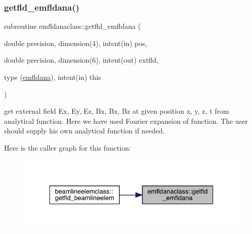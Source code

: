 \subsubsection{\texorpdfstring{getfld\_emfldana()}{getfld\_emfldana()}}
{\footnotesize\ttfamily subroutine emfldanaclass\+::getfld\+\_\+emfldana (\begin{DoxyParamCaption}\item[{double precision, dimension(4), intent(in)}]{pos,  }\item[{double precision, dimension(6), intent(out)}]{extfld,  }\item[{type (\mbox{\hyperlink{namespaceemfldanaclass_structemfldanaclass_1_1emfldana}{emfldana}}), intent(in)}]{this }\end{DoxyParamCaption})}



get external field Ex, Ey, Ez, Bx, Bx, Bz at given position x, y, z, t from analytical function. Here we have used Fourier expansion of function. The user should supply his own analytical function if needed. 

Here is the caller graph for this function\+:\nopagebreak
\begin{figure}[H]
\begin{center}
\leavevmode
\includegraphics[width=334pt]{namespaceemfldanaclass_abf2e2171f7b0a3aa36462d1965e428f4_icgraph}
\end{center}
\end{figure}
\mbox{\label{namespaceemfldanaclass_a95772a7b3030b57d7c0753ef96a2f764}} 
